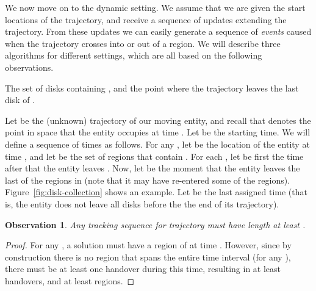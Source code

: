 \documentclass[runningheads]{llncs}
\newcommand{\marrow}{\marginpar[\hfill]{}}
\renewcommand{\remark}[3]{\textcolor{blue}{\textsc{#1 #2:}}
\textcolor{red}{\marrow\textsf{#3}}}
\renewcommand{\remark}[3]{\relax}
\newcommand{\maarten}[2][says]{\remark{Maarten}{#1}{#2}}
\newtheorem {observation}[theorem] {Observation}
\begin{document}
 We now move on to the dynamic setting. We assume that we are given the start locations of the trajectory, and receive a sequence of updates extending the trajectory. From these updates we can easily generate a sequence of \emph{events} caused when the trajectory crosses into or out of a region.
We will describe three algorithms for different settings, which are all based on the following observations.

  \maarten {This would be about the right moment to elaborate some more on competitive ratios.}

    
     {The set  of disks containing , and the point  where the trajectory leaves the last disk of .}
    
    Let  be the (unknown) trajectory of our moving entity, and recall that  denotes the point in space that the entity occupies at time .
    Let  be the starting time. We will define a sequence of times  as follows. For any , let  be the location of the entity at time , and let  be the set of regions that contain . For each , let  be first the time after  that the entity leaves .
    Now, let  be the moment that the entity leaves the last of the regions in  (note that it may have re-entered some of the regions).
    Figure~\ref {fig:disk-collection} shows an example.
    Let  be the last assigned time (that is, the entity does not leave all disks  before the the end of its trajectory).

    \begin {observation} \label {obs:k}
      Any tracking sequence  for trajectory  must have length at least .
    \end {observation}
    
    \maarten {Not sure this needs a proof...}
    \begin {proof}
      For any , a solution must have a region of  at time . However, since by construction there is no region that spans the entire time interval  (for any ), there must be at least one handover during this time, resulting in at least  handovers, and at least  regions.
    \end {proof}
\end{document}
